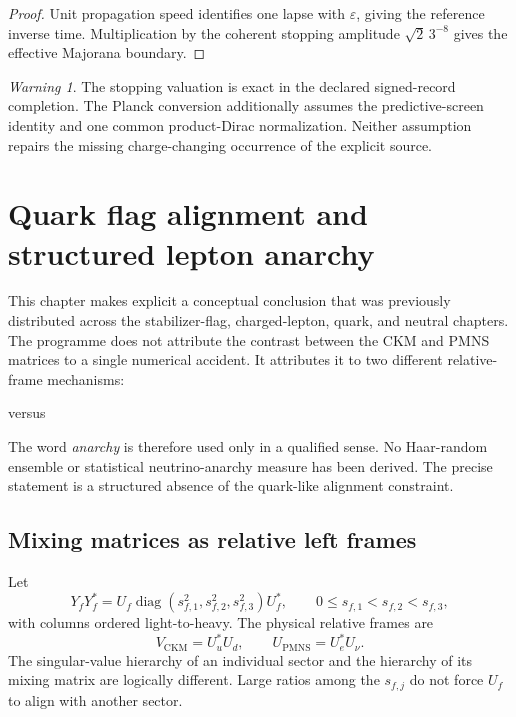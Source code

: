 \documentclass[11pt,oneside,openany]{book}
\numberwithin{equation}{chapter}
\theoremstyle{definition}
\theoremstyle{remark}
\newtheorem{warning}[theorem]{Warning}
\newcommand{\diag}{\operatorname{diag}}
\newcommand{\CKM}{\mathrm{CKM}}
\newcommand{\PMNS}{\mathrm{PMNS}}
\begin{document}
\begin{proof}
Unit propagation speed identifies one lapse with
\(\varepsilon\), giving the reference inverse time.  Multiplication by the
coherent stopping amplitude \(\sqrt2\,3^{-8}\) gives the effective Majorana
boundary.
\end{proof}

\begin{warning}
The stopping valuation is exact in the declared signed-record completion.
The Planck conversion additionally assumes the predictive-screen identity
and one common product-Dirac normalization.  Neither assumption repairs the
missing charge-changing occurrence of the explicit source.
\end{warning}



\chapter{Quark flag alignment and structured lepton anarchy}
\label{ch:hierarchy-versus-anarchy}

This chapter makes explicit a conceptual conclusion that was previously
distributed across the stabilizer-flag, charged-lepton, quark, and neutral
chapters.  The programme does not attribute the contrast between the CKM
and PMNS matrices to a single numerical accident.  It attributes it to two
different relative-frame mechanisms:
\begin{center}
\hfill versus \hfill
{}
\end{center}
The word \emph{anarchy} is therefore used only in a qualified sense.  No
Haar-random ensemble or statistical neutrino-anarchy measure has been
derived.  The precise statement is a structured absence of the
quark-like alignment constraint.

\section{Mixing matrices as relative left frames}

Let
\[
 Y_fY_f^*
 =U_f\diag(s_{f,1}^2,s_{f,2}^2,s_{f,3}^2)U_f^*,
 \qquad
 0\le s_{f,1}<s_{f,2}<s_{f,3},
\]
with columns ordered light-to-heavy.  The physical relative frames are
\[
 V_{\CKM}=U_u^*U_d,
 \qquad
 U_{\PMNS}=U_e^*U_\nu.
\]
The singular-value hierarchy of an individual sector and the hierarchy of
its mixing matrix are logically different.  Large ratios among the
\(s_{f,j}\) do not force \(U_f\) to align with another sector.
\end{document}
